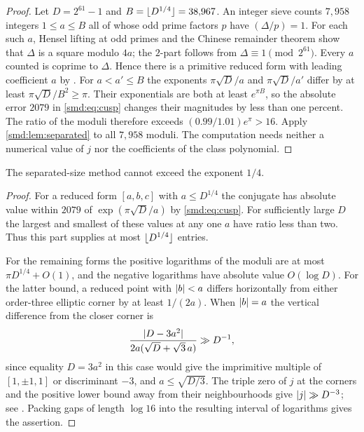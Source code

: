 \begin{proof}
Let $D=2^{61}-1$ and $B=\lfloor D^{1/4}\rfloor=38{,}967$. An integer sieve counts $7{,}958$
integers $1\le a\le B$ all of whose odd prime factors $p$ have $(\Delta/p)=1$. For each such $a$, Hensel
lifting at odd primes and the Chinese remainder theorem show that $\Delta$ is a square
modulo $4a$; the $2$-part follows from $\Delta\equiv1\pmod{2^{61}}$. Every $a$ counted is
coprime to $\Delta$. Hence there is a primitive reduced form with leading coefficient $a$
by \cite[Proposition~3.1(1)]{Bilu2022Trinomials}. For $a<a'\le B$ the exponents
$\pi\sqrt D/a$ and $\pi\sqrt D/a'$ differ by at least $\pi\sqrt D/B^2\ge\pi$. Their
exponentials are both at least $e^{\pi B}$, so the absolute error $2079$ in
\eqref{smd:eq:cusp} changes their magnitudes by less than one percent. The ratio of the
moduli therefore exceeds $(0.99/1.01)e^\pi>16$. Apply \cref{smd:lem:separated} to all
$7{,}958$ moduli. The computation needs neither a numerical value of $j$ nor the
coefficients of the class polynomial.
\end{proof}


The separated-size method cannot exceed the exponent $1/4$.


\begin{proof}
For a reduced form $[a,b,c]$ with $a\le D^{1/4}$ the conjugate has absolute value within
$2079$ of $\exp(\pi\sqrt D/a)$ by \eqref{smd:eq:cusp}. For sufficiently large $D$ the
largest and smallest of these values at any one $a$ have ratio less than two. Thus this
part supplies at most $\lfloor D^{1/4}\rfloor$ entries.

For the remaining forms the positive logarithms of the moduli are at most
$\pi D^{1/4}+O(1)$, and the negative logarithms have absolute value $O(\log D)$. For the
latter bound, a reduced point with $\lvert b\rvert<a$ differs horizontally from either
order-three elliptic corner by at least $1/(2a)$. When $\lvert b\rvert=a$ the vertical difference
from the closer corner is
\[
 \frac{\lvert D-3a^2\rvert}{2a(\sqrt D+\sqrt3\,a)}\gg D^{-1},
\]
since equality $D=3a^2$ in this case would give the imprimitive multiple of
$[1,\pm1,1]$ or discriminant $-3$, and $a\le\sqrt{D/3}$. The triple zero of $j$ at the
corners and the positive lower bound away from their neighbourhoods give
$\lvert j\rvert\gg D^{-3}$; see \cite[Lemma~11.6]{Bilu2022Trinomials}. Packing gaps of length
$\log16$ into the resulting interval of logarithms gives the assertion.
\end{proof}

